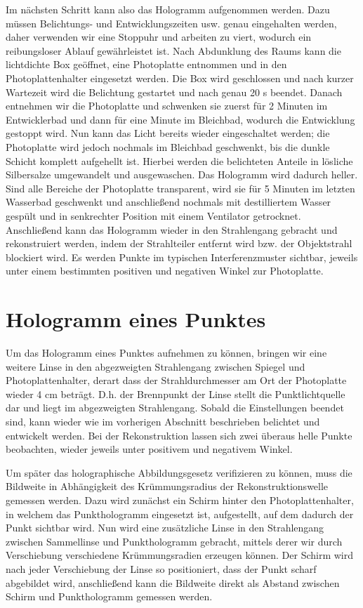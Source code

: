 \documentclass[bigchapter,colorback,accentcolor=tud4b,linedtoc,11pt]{tudreport}
\begin{document}
Im nächsten Schritt kann also das Hologramm aufgenommen werden. Dazu müssen Belichtungs- und Entwicklungszeiten usw. genau eingehalten werden, daher verwenden wir eine Stoppuhr und arbeiten zu viert, wodurch ein reibungsloser Ablauf gewährleistet ist. Nach Abdunklung des Raums kann die lichtdichte Box geöffnet, eine Photoplatte entnommen und in den Photoplattenhalter eingesetzt werden. Die Box wird geschlossen und nach kurzer Wartezeit wird die Belichtung gestartet und nach genau 20 s beendet. Danach entnehmen wir die Photoplatte und schwenken sie zuerst für 2 Minuten im Entwicklerbad und dann für eine Minute im Bleichbad, wodurch die Entwicklung gestoppt wird. Nun kann das Licht bereits wieder eingeschaltet werden; die Photoplatte wird jedoch nochmals im Bleichbad geschwenkt, bis die dunkle Schicht komplett aufgehellt ist. Hierbei werden die belichteten Anteile in lösliche Silbersalze umgewandelt und ausgewaschen. Das Hologramm wird dadurch heller. Sind alle Bereiche der Photoplatte transparent, wird sie für 5 Minuten im letzten Wasserbad geschwenkt und anschließend nochmals mit destilliertem Wasser gespült und in senkrechter Position mit einem Ventilator getrocknet. Anschließend kann das Hologramm wieder in den Strahlengang gebracht und rekonstruiert werden, indem der Strahlteiler entfernt wird bzw. der Objektstrahl blockiert wird. Es werden Punkte im typischen Interferenzmuster sichtbar, jeweils unter einem bestimmten positiven und negativen Winkel zur Photoplatte.

\section{Hologramm eines Punktes}

Um das Hologramm eines Punktes aufnehmen zu können, bringen wir eine weitere Linse in den abgezweigten Strahlengang zwischen Spiegel und Photoplattenhalter, derart dass der Strahldurchmesser am Ort der Photoplatte wieder 4 cm beträgt. D.h. der Brennpunkt der Linse stellt die Punktlichtquelle dar und liegt im abgezweigten Strahlengang. Sobald die Einstellungen beendet sind, kann wieder wie im vorherigen Abschnitt beschrieben belichtet und entwickelt werden. Bei der Rekonstruktion lassen sich zwei überaus helle Punkte beobachten, wieder jeweils unter positivem und negativem Winkel.

Um später das holographische Abbildungsgesetz verifizieren zu können, muss die Bildweite in Abhängigkeit des Krümmungsradius der Rekonstruktionswelle gemessen werden. Dazu wird zunächst ein Schirm hinter den Photoplattenhalter, in welchem das Punkthologramm eingesetzt ist, aufgestellt, auf dem dadurch der Punkt sichtbar wird. Nun wird eine zusätzliche Linse in den Strahlengang zwischen Sammellinse und Punkthologramm gebracht, mittels derer wir durch Verschiebung verschiedene Krümmungsradien erzeugen können. Der Schirm wird nach jeder Verschiebung der Linse so positioniert, dass der Punkt scharf abgebildet wird, anschließend kann die Bildweite direkt als Abstand zwischen Schirm und Punkthologramm gemessen werden.
\end{document}
